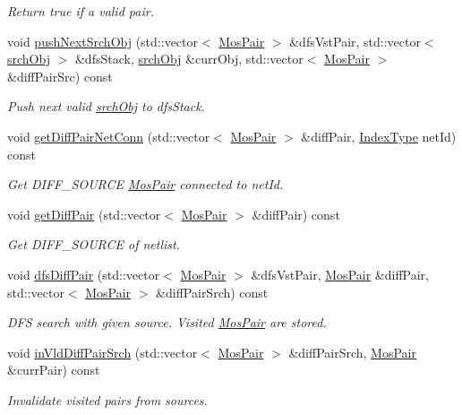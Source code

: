 \begin{DoxyCompactItemize}
\begin{DoxyCompactList}\small\item\em Return true if a valid pair. \end{DoxyCompactList}\item 
void \hyperlink{classSymDetect_a9bdb845d015762b59f3dc977a76aed32}{push\+Next\+Srch\+Obj} (std\+::vector$<$ \hyperlink{structMosPair}{Mos\+Pair} $>$ \&dfs\+Vst\+Pair, std\+::vector$<$ \hyperlink{structSymDetect_1_1srchObj}{srch\+Obj} $>$ \&dfs\+Stack, \hyperlink{structSymDetect_1_1srchObj}{srch\+Obj} \&curr\+Obj, std\+::vector$<$ \hyperlink{structMosPair}{Mos\+Pair} $>$ \&diff\+Pair\+Src) const
\begin{DoxyCompactList}\small\item\em Push next valid \hyperlink{structSymDetect_1_1srchObj}{srch\+Obj} to dfs\+Stack. \end{DoxyCompactList}\item 
void \hyperlink{classSymDetect_acbcaf5319edd53b2b6cedaa5818bdd38}{get\+Diff\+Pair\+Net\+Conn} (std\+::vector$<$ \hyperlink{structMosPair}{Mos\+Pair} $>$ \&diff\+Pair, \hyperlink{type_8h_a581e8093e28e7362f2b6937296190676}{Index\+Type} net\+Id) const
\begin{DoxyCompactList}\small\item\em Get D\+I\+F\+F\+\_\+\+S\+O\+U\+R\+CE \hyperlink{structMosPair}{Mos\+Pair} connected to net\+Id. \end{DoxyCompactList}\item 
void \hyperlink{classSymDetect_af04b93dac7e090cef8e741d8d1812485}{get\+Diff\+Pair} (std\+::vector$<$ \hyperlink{structMosPair}{Mos\+Pair} $>$ \&diff\+Pair) const
\begin{DoxyCompactList}\small\item\em Get D\+I\+F\+F\+\_\+\+S\+O\+U\+R\+CE of netlist. \end{DoxyCompactList}\item 
void \hyperlink{classSymDetect_acd33a2c834493240fc4e8840819d676c}{dfs\+Diff\+Pair} (std\+::vector$<$ \hyperlink{structMosPair}{Mos\+Pair} $>$ \&dfs\+Vst\+Pair, \hyperlink{structMosPair}{Mos\+Pair} \&diff\+Pair, std\+::vector$<$ \hyperlink{structMosPair}{Mos\+Pair} $>$ \&diff\+Pair\+Srch) const
\begin{DoxyCompactList}\small\item\em D\+FS search with given source. Visited \hyperlink{structMosPair}{Mos\+Pair} are stored. \end{DoxyCompactList}\item 
void \hyperlink{classSymDetect_ae6a1ba27f6768f215cba0623b6e2ce08}{in\+Vld\+Diff\+Pair\+Srch} (std\+::vector$<$ \hyperlink{structMosPair}{Mos\+Pair} $>$ \&diff\+Pair\+Srch, \hyperlink{structMosPair}{Mos\+Pair} \&curr\+Pair) const
\begin{DoxyCompactList}\small\item\em Invalidate visited pairs from sources. \end{DoxyCompactList}\end{DoxyCompactItemize}
